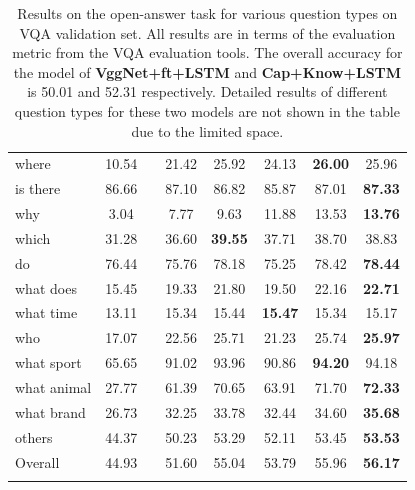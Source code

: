 \begin{table}[t!]
{\begin{tabular}{lclccccc}
  where                        & 10.54        &  & 21.42            & 25.92            & 24.13            & \textbf{26.00}   & 25.96 \\
  is there                     & 86.66        &  & 87.10            & 86.82            & 85.87            & 87.01            & \textbf{87.33} \\
  why                          & 3.04         &  & 7.77             & 9.63             & 11.88            & 13.53            & \textbf{13.76}  \\
  which                        & 31.28        &  & 36.60            & \textbf{39.55}   & 37.71            & 38.70            & 38.83 \\
  do                           & 76.44        &  & 75.76            & 78.18            & 75.25            & 78.42            & \textbf{78.44} \\
  what does                    & 15.45        &  & 19.33            & 21.80            & 19.50            & 22.16            & \textbf{22.71} \\
  what time                    & 13.11        &  & 15.34            & 15.44            & \textbf{15.47}   & 15.34            & 15.17 \\
  who                          & 17.07        &  & 22.56            & 25.71            & 21.23            & 25.74            & \textbf{25.97} \\
  what sport                   & 65.65        &  & 91.02            & 93.96            & 90.86            & \textbf{94.20}   & 94.18 \\
  what animal                  & 27.77        &  & 61.39            & 70.65            & 63.91            & 71.70            & \textbf{72.33} \\
  what brand                   & 26.73        &  & 32.25            & 33.78            & 32.44            & 34.60            & \textbf{35.68} \\
  others                       & 44.37        &  & 50.23            & 53.29            & 52.11            & 53.45            & \textbf{53.53}     \\ \hline
  Overall                      & 44.93        &  & 51.60            & 55.04            & 53.79            & 55.96            & \textbf{56.17} \\ \Xhline{2\arrayrulewidth}
 \end{tabular}}
\vspace{1pt}
\caption{Results on the open-answer task for various question types on VQA validation set. All results are in terms of the evaluation metric from the VQA evaluation tools. The overall accuracy for the model of \textbf{VggNet+ft+LSTM} and \textbf{Cap+Know+LSTM} is 50.01 and 52.31 respectively. Detailed results of different question types for these two models are not shown in the table due to the limited space.}
\vspace{-12pt}
\label{tab:COCO_Results}
\end{table}

